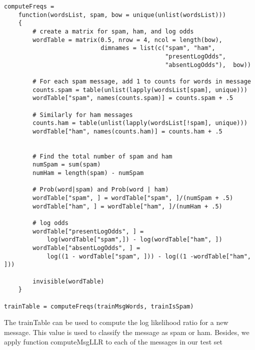 \documentclass{article}
\begin{document}
\begin{verbatim}
computeFreqs =
    function(wordsList, spam, bow = unique(unlist(wordsList)))
    {
        # create a matrix for spam, ham, and log odds
        wordTable = matrix(0.5, nrow = 4, ncol = length(bow), 
                           dimnames = list(c("spam", "ham", 
                                             "presentLogOdds", 
                                             "absentLogOdds"),  bow))
        
        # For each spam message, add 1 to counts for words in message
        counts.spam = table(unlist(lapply(wordsList[spam], unique)))
        wordTable["spam", names(counts.spam)] = counts.spam + .5
        
        # Similarly for ham messages
        counts.ham = table(unlist(lapply(wordsList[!spam], unique)))  
        wordTable["ham", names(counts.ham)] = counts.ham + .5  
        
        
        # Find the total number of spam and ham
        numSpam = sum(spam)
        numHam = length(spam) - numSpam
        
        # Prob(word|spam) and Prob(word | ham)
        wordTable["spam", ] = wordTable["spam", ]/(numSpam + .5)
        wordTable["ham", ] = wordTable["ham", ]/(numHam + .5)
        
        # log odds
        wordTable["presentLogOdds", ] = 
            log(wordTable["spam",]) - log(wordTable["ham", ])
        wordTable["absentLogOdds", ] = 
            log((1 - wordTable["spam", ])) - log((1 -wordTable["ham", ]))
        
        invisible(wordTable)
    }

trainTable = computeFreqs(trainMsgWords, trainIsSpam)
\end{verbatim}

The trainTable can be used to compute the log likelihood ratio for a new message. This value is used to classify the message as spam or ham. Besides, we apply function computeMsgLLR to each of the messages in our test set
\end{document}

